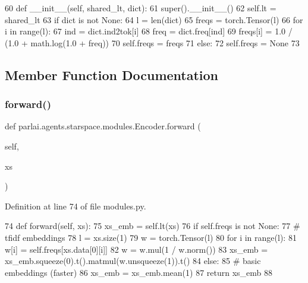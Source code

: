 \begin{DoxyCode}
60     \textcolor{keyword}{def }\_\_init\_\_(self, shared\_lt, dict):
61         super().\_\_init\_\_()
62         self.lt = shared\_lt
63         \textcolor{keywordflow}{if} dict \textcolor{keywordflow}{is} \textcolor{keywordflow}{not} \textcolor{keywordtype}{None}:
64             l = len(dict)
65             freqs = torch.Tensor(l)
66             \textcolor{keywordflow}{for} i \textcolor{keywordflow}{in} range(l):
67                 ind = dict.ind2tok[i]
68                 freq = dict.freq[ind]
69                 freqs[i] = 1.0 / (1.0 + math.log(1.0 + freq))
70             self.freqs = freqs
71         \textcolor{keywordflow}{else}:
72             self.freqs = \textcolor{keywordtype}{None}
73 
\end{DoxyCode}


\subsection{Member Function Documentation}
\mbox{\label{classparlai_1_1agents_1_1starspace_1_1modules_1_1Encoder_aec05cf4a81565a25aa85394194301cea}} 
\subsubsection{\texorpdfstring{forward()}{forward()}}
{\footnotesize\ttfamily def parlai.\+agents.\+starspace.\+modules.\+Encoder.\+forward (\begin{DoxyParamCaption}\item[{}]{self,  }\item[{}]{xs }\end{DoxyParamCaption})}



Definition at line 74 of file modules.\+py.


\begin{DoxyCode}
74     \textcolor{keyword}{def }forward(self, xs):
75         xs\_emb = self.lt(xs)
76         \textcolor{keywordflow}{if} self.freqs \textcolor{keywordflow}{is} \textcolor{keywordflow}{not} \textcolor{keywordtype}{None}:
77             \textcolor{comment}{# tfidf embeddings}
78             l = xs.size(1)
79             w = torch.Tensor(l)
80             \textcolor{keywordflow}{for} i \textcolor{keywordflow}{in} range(l):
81                 w[i] = self.freqs[xs.data[0][i]]
82             w = w.mul(1 / w.norm())
83             xs\_emb = xs\_emb.squeeze(0).t().matmul(w.unsqueeze(1)).t()
84         \textcolor{keywordflow}{else}:
85             \textcolor{comment}{# basic embeddings (faster)}
86             xs\_emb = xs\_emb.mean(1)
87         \textcolor{keywordflow}{return} xs\_emb
88 \end{DoxyCode}


